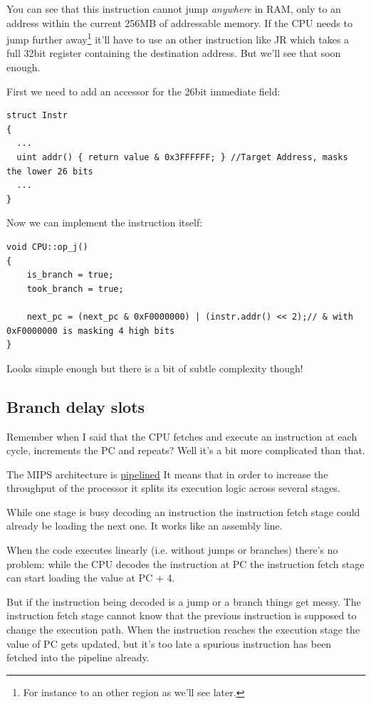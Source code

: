 \documentclass[a4paper]{article}
\begin{document}
You can see that this instruction cannot jump \emph{anywhere} in RAM,
only to an address within the current 256MB of addressable memory. If
the CPU needs to jump further away\footnote{For instance to an other
  region as we'll see later.} it'll have to use an other instruction
like JR which takes a full 32bit register containing the destination
address. But we'll see that soon enough.

First we need to add an accessor for the 26bit immediate field:

\begin{lstlisting}
struct Instr
{
  ...
  uint addr() { return value & 0x3FFFFFF; } //Target Address, masks the lower 26 bits
  ...
}
\end{lstlisting}

Now we can implement the instruction itself:

\begin{lstlisting}
void CPU::op_j()
{
	is_branch = true;
	took_branch = true;
	
	next_pc = (next_pc & 0xF0000000) | (instr.addr() << 2);// & with 0xF0000000 is masking 4 high bits
}
\end{lstlisting}

Looks simple enough but there is a bit of subtle complexity though!

\subsection{Branch delay slots}
\label{sec:bds}

Remember when I said that the CPU fetches and execute an instruction
at each cycle, increments the PC and repeats? Well it's a bit more
complicated than that.

The MIPS architecture is
\href{https://en.wikipedia.org/wiki/Classic_RISC_pipeline}{pipelined}
It means that in order to increase the throughput of the processor it
splits its execution logic across several stages.

While one stage is busy decoding an instruction the instruction fetch
stage could already be loading the next one. It works like an assembly
line.

When the code executes linearly (i.e. without jumps or branches)
there's no problem: while the CPU decodes the instruction at PC the
instruction fetch stage can start loading the value at PC + 4.

But if the instruction being decoded is a jump or a branch things get
messy. The instruction fetch stage cannot know that the previous
instruction is supposed to change the execution path. When the
instruction reaches the execution stage the value of PC gets updated,
but it's too late a spurious instruction has been fetched into the
pipeline already.
\end{document}
